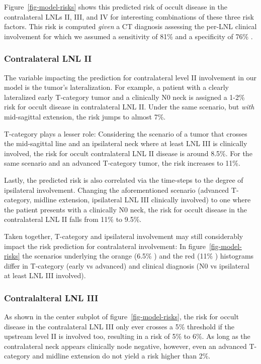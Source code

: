 \documentclass[
  sn-mathphys-num,
]{sn-jnl}
\begin{document}
Figure~\ref{fig-model-risks} shows this predicted risk of occult disease
in the contralateral LNLs II, III, and IV for interesting combinations
of these three risk factors. This risk is computed \emph{given} a CT
diagnosis assessing the per-LNL clinical involvement for which we
assumed a sensitivity of 81\% and a specificity of 76\%
\citep{de_bondt_detection_2007}.

\subsubsection{Contralateral LNL II}\label{contralateral-lnl-ii}

The variable impacting the prediction for contralateral level II
involvement in our model is the tumor's lateralization. For example, a
patient with a clearly lateralized early T-category tumor and a
clinically N0 neck is assigned a 1-2\% risk for occult disease in
contralateral LNL II. Under the same scenario, but \emph{with}
mid-sagittal extension, the risk jumps to almost 7\%.

T-category plays a lesser role: Considering the scenario of a tumor that
crosses the mid-sagittal line and an ipsilateral neck where at least LNL
III is clinically involved, the risk for occult contralateral LNL II
disease is around 8.5\%. For the same scenario and an advanced
T-category tumor, the risk increases to 11\%.

Lastly, the predicted risk is also correlated via the time-steps to the
degree of ipsilateral involvement. Changing the aforementioned scenario
(advanced T-category, midline extension, ipsilateral LNL III clinically
involved) to one where the patient presents with a clinically N0 neck,
the risk for occult disease in the contralateral LNL II falls from 11\%
to 9.5\%.

Taken together, T-category and ipsilateral involvement may still
considerably impact the risk prediction for contralateral involvement:
In figure~\ref{fig-model-risks} the scenarios underlying the orange
(6.5\% ) and the red (11\% ) histograms differ in T-category (early vs
advanced) and clinical diagnosis (N0 vs ipsilateral at least LNL III
involved).

\subsubsection{Contralalteral LNL III}\label{contralalteral-lnl-iii}

As shown in the center subplot of figure~\ref{fig-model-risks}, the risk
for occult disease in the contralateral LNL III only ever crosses a 5\%
threshold if the upstream level II is involved too, resulting in a risk
of 5\% to 6\%. As long as the contralateral neck appears clinically node
negative, however, even an advanced T-category and midline extension do
not yield a risk higher than 2\%.
\end{document}
